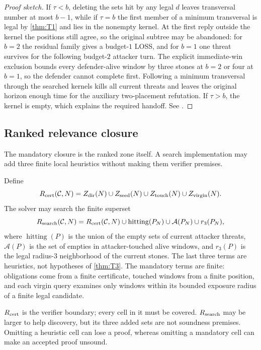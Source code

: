 \begin{proof}[Proof sketch]
If $\tau<b$, deleting the sets hit by any legal $d$ leaves transversal number
at most $b-1$, while if $\tau=b$ the first member of a minimum transversal is
legal by \cref{thm:T1} and lies in the nonempty kernel.  At the first reply
outside the kernel the positions still agree, so the original subtree may be
abandoned: for $b=2$ the residual family gives a budget-$1$ LOSS, and for
$b=1$ one threat survives for the following budget-$2$ attacker turn.  The
explicit immediate-win exclusion bounds every defender-alive window by three
stones at $b=2$ or four at $b=1$, so the defender cannot complete first.
Following a minimum transversal through the searched kernels kills all
current threats and leaves the original horizon enough time for the auxiliary
two-placement refutation.  If $\tau>b$, the kernel is empty, which explains
the required handoff.  See \cite{hexobot-companions}.
\end{proof}

\subsection{Ranked relevance closure}

The mandatory closure is the ranked zone itself.  A search implementation may
add three finite local heuristics without making them verifier premises.

\begin{definition}
\label{def:D13}
Define
\[
 R_{\mathrm{cert}}(\mathcal C,N)=
 Z_{\mathrm{dir}}(N)\cup Z_{\mathrm{seed}}(N)\cup Z_{\mathrm{touch}}(N)\cup Z_{\mathrm{virgin}}(N).
\]
The solver may search the finite superset
\[
 R_{\mathrm{search}}(\mathcal C,N)=R_{\mathrm{cert}}(\mathcal C,N)
 \cup\operatorname{hitting}(P_N)\cup\mathcal A(P_N)\cup r_3(P_N),
\]
where $\operatorname{hitting}(P)$ is the union of the empty sets of current
attacker threats, $\mathcal A(P)$ is the set of empties in attacker-touched
alive windows, and $r_3(P)$ is the legal radius-$3$ neighborhood of the
current stones.  The last three terms are heuristics, not hypotheses of
\cref{thm:T3}.  The mandatory terms are finite: obligations come from a
finite certificate, touched windows from a finite position, and each virgin
query examines only windows within its bounded exposure radius of a finite
legal candidate.
\end{definition}

\begin{plainterms}
$R_{\mathrm{cert}}$ is the verifier boundary; every cell in it must be covered.
$R_{\mathrm{search}}$ may be larger to help discovery, but its three added sets are not
soundness premises.  Omitting a heuristic cell can lose a proof, whereas
omitting a mandatory cell can make an accepted proof unsound.
\end{plainterms}

